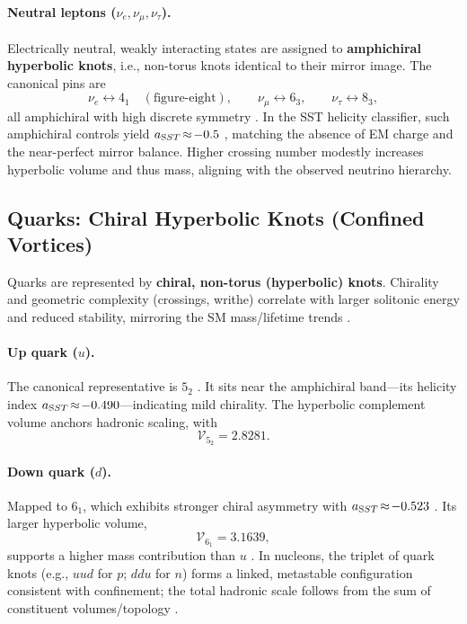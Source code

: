 \documentclass[11pt]{article}
\begin{document}
        \paragraph{Neutral leptons ($\nu_e,\nu_\mu,\nu_\tau$).}
            Electrically neutral, weakly interacting states are assigned to \textbf{amphichiral hyperbolic knots}, i.e., non-torus knots identical to their mirror image. The canonical pins are
            \[
                \nu_e \leftrightarrow 4_1\quad(\text{figure-eight}),\qquad
                \nu_\mu \leftrightarrow 6_3,\qquad
                \nu_\tau \leftrightarrow 8_3,
            \]
            all amphichiral with high discrete symmetry \cite{KnotAtlas}. In the SST helicity classifier, such amphichiral controls yield $a_{\textrm SST}\!\approx\!-0.5$ \cite{Iskandarani2025Helicity}, matching the absence of EM charge and the near-perfect mirror balance. Higher crossing number modestly increases hyperbolic volume and thus mass, aligning with the observed neutrino hierarchy.

\subsection{Quarks: Chiral Hyperbolic Knots (Confined Vortices)}

    Quarks are represented by \textbf{chiral, non-torus (hyperbolic) knots}. Chirality and geometric complexity (crossings, writhe) correlate with larger solitonic energy and reduced stability, mirroring the SM mass/lifetime trends \cite{Iskandarani2025Helicity}.

    \paragraph{Up quark ($u$).}
        The canonical representative is $5_2$ \cite{Iskandarani2025Helicity}. It sits near the amphichiral band—its helicity index $a_{\textrm SST}\!\approx\!-0.490$—indicating mild chirality. The hyperbolic complement volume anchors hadronic scaling, with
        \[
            \mathcal{V}_{5_2}=2.8281.
        \]

    \paragraph{Down quark ($d$).}
        Mapped to $6_1$, which exhibits stronger chiral asymmetry with $a_{\textrm SST}\!\approx\!-0.523$ \cite{Iskandarani2025Helicity}. Its larger hyperbolic volume,
        \[
            \mathcal{V}_{6_1}=3.1639,
        \]
        supports a higher mass contribution than $u$ \cite{Iskandarani2025Mass}. In nucleons, the triplet of quark knots (e.g., $u\!u\!d$ for $p$; $d\!d\!u$ for $n$) forms a linked, metastable configuration consistent with confinement; the total hadronic scale follows from the sum of constituent volumes/topology \cite{Iskandarani2025Mass}.
\end{document}
